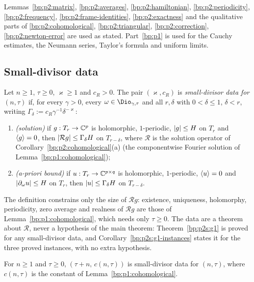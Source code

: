 Lemmas~\ref{bp:p2:matrix}, \ref{bp:p2:averages}, \ref{bp:p2:hamiltonian}, \ref{bp:p2:periodicity},
\ref{bp:p2:frequency}, \ref{bp:p2:frame-identities}, \ref{bp:p2:exactness} and the qualitative parts of
\ref{bp:p2:cohomological}, \ref{bp:p2:triangular}, \ref{bp:p2:correction}, \ref{bp:p2:newton-error} are used as
stated. Part~\ref{bp:p1} is used for the Cauchy estimates, the Neumann series, Taylor's formula and uniform
limits.

\subsection{Small-divisor data}\label{bp:p2s:sec-cohdata}

\begin{definition}\label{bp:p2s:cohdata}
Let $n\ge1$, $\tau\ge0$, $\varkappa\ge1$ and $c_R>0$. The pair $(\varkappa,c_R)$ is \emph{small-divisor data for
$(n,\tau)$} if, for every $\gamma>0$, every $\omega\in\Dio_{\gamma,\tau}$ and all $r,\delta$ with $0<\delta\le1$,
$\delta<r$, writing $\Gamma_\delta:=c_R\gamma^{-1}\delta^{-\varkappa}$:
\begin{enumerate}[label=(\alph*)]
\item \emph{(solution)} if $g:T_r\to\mathbb{C}^p$ is holomorphic, $1$-periodic, $\lvert g\rvert\le H$ on $T_r$ and $\langle g\rangle=0$,
  then $\lvert \mathcal Rg\rvert\le\Gamma_\delta H$ on $T_{r-\delta}$, where $\mathcal R$ is the solution operator of
  Corollary~\ref{bp:p2:cohomological}(a) (the componentwise Fourier solution of Lemma~\ref{bp:p1:cohomological});
\item \emph{(a-priori bound)} if $u:T_r\to\mathbb{C}^{p\times q}$ is holomorphic, $1$-periodic, $\langle u\rangle=0$ and
  $\lvert \partial_\omega u\rvert\le H$ on $T_r$, then $\lvert u\rvert\le\Gamma_\delta H$ on $T_{r-\delta}$.
\end{enumerate}
\end{definition}

The definition constrains only the size of $\mathcal Rg$: existence, uniqueness, holomorphy, periodicity, zero
average and realness of $\mathcal Rg$ are those of Lemma~\ref{bp:p1:cohomological}, which needs only $\tau\ge0$.
The data are a theorem about $\mathcal R$, never a hypothesis of the main theorem: Theorem~\ref{bp:p2s:g1} is
proved for any small-divisor data, and Corollary~\ref{bp:p2s:g1-instances} states it for the three proved
instances, with no extra hypothesis.

\begin{lemma}\label{bp:p2s:cohdata-crude}
For $n\ge1$ and $\tau\ge0$, $(\tau+n,\,c(n,\tau))$ is small-divisor data for $(n,\tau)$, where $c(n,\tau)$ is
the constant of Lemma~\ref{bp:p1:cohomological}.
\end{lemma}


